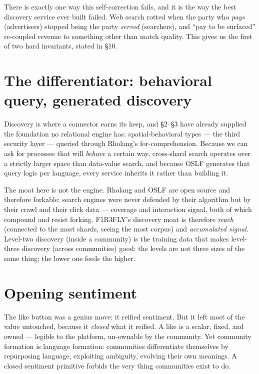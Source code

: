 \documentclass[11pt]{article}
\begin{document}
There is exactly one way this self-correction fails, and it is the way the best discovery service ever built failed. Web search rotted when the party who \emph{pays} (advertisers) stopped being the party \emph{served} (searchers), and ``pay to be surfaced'' re-coupled revenue to something other than match quality. This gives us the first of two hard invariants, stated in \S10.

\section{The differentiator: behavioral query, generated discovery}

Discovery is where a connector earns its keep, and \S2--\S3 have already supplied the foundation no relational engine has: spatial-behavioral types --- the third security layer --- queried through Rholang's for-comprehension. Because we can ask for processes that will \emph{behave} a certain way, cross-shard search operates over a strictly larger space than data-value search, and because OSLF generates that query logic per language, every service inherits it rather than building it.

The moat here is not the engine. Rholang and OSLF are open source and therefore forkable; search engines were never defended by their algorithm but by their crawl and their click data --- coverage and interaction signal, both of which compound and resist forking. F1R3FLY's discovery moat is therefore \emph{reach} (connected to the most shards, seeing the most corpus) and \emph{accumulated signal}. Level-two discovery (inside a community) is the training data that makes level-three discovery (across communities) good: the levels are not three sizes of the same thing; the lower one feeds the higher.

\section{Opening sentiment}

The like button was a genius move: it reified sentiment. But it left most of the value untouched, because it \emph{closed} what it reified. A like is a scalar, fixed, and owned --- legible to the platform, un-ownable by the community. Yet community formation is language formation: communities differentiate themselves by repurposing language, exploiting ambiguity, evolving their own meanings. A closed sentiment primitive forbids the very thing communities exist to do.
\end{document}
